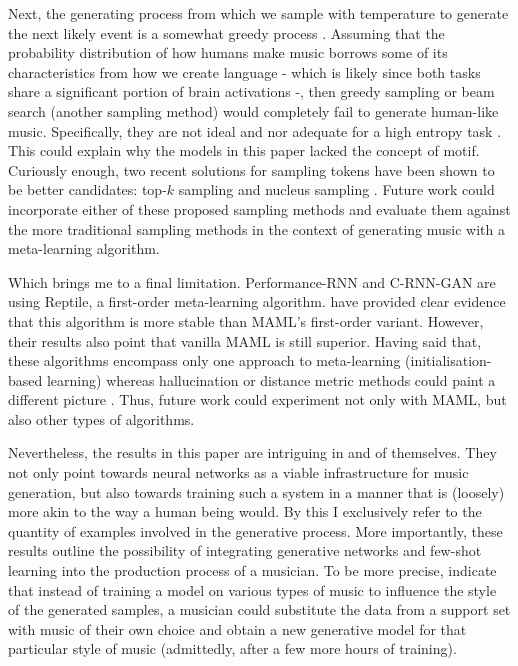 \documentclass[a4paper]{book}
\begin{document}
Next, the generating process from which we sample with temperature to generate the next likely event is a somewhat greedy process \parencite{holtzman_curious_2019}. Assuming that the probability distribution of how humans make music borrows some of its characteristics from how we create language - which is likely since both tasks share a significant portion of brain activations \parencite{brown_music_2006} -, then greedy sampling or beam search (another sampling method) would completely fail to generate human-like music. Specifically, they are not ideal and nor adequate for a high entropy task \parencite{holtzman_curious_2019}. This could explain why the models in this paper lacked the concept of motif. Curiously enough, two recent solutions for sampling tokens have been shown to be better candidates: top-$k$ sampling \parencite{fan_hierarchical_2018} and nucleus sampling \parencite[also known as top-$p$ sampling;][]{holtzman_curious_2019}. Future work could incorporate either of these proposed sampling methods and evaluate them against the more traditional sampling methods in the context of generating music with a meta-learning algorithm.

Which brings me to a final limitation. Performance-RNN and C-RNN-GAN are using Reptile, a first-order meta-learning algorithm. \textcite{nichol_first-order_2018} have provided clear evidence that this algorithm is more stable than MAML's first-order variant. However, their results also point that vanilla MAML is still superior. Having said that, these algorithms encompass only one approach to meta-learning (initialisation-based learning) whereas hallucination or distance metric methods could paint a different picture \parencite{chen_closer_2018}. Thus, future work could experiment not only with MAML, but also other types of algorithms.

Nevertheless, the results in this paper are intriguing in and of themselves. They not only point towards neural networks as a viable infrastructure for music generation, but also towards training such a system in a manner that is (loosely) more akin to the way a human being would. By this I exclusively refer to the quantity of examples involved in the generative process. More importantly, these results outline the possibility of integrating generative networks and few-shot learning into the production process of a musician. To be more precise, \textcite{larochelle_few-shot_2017} indicate that instead of training a model on various types of music to influence the style of the generated samples, a musician could substitute the data from a support set with music of their own choice and obtain a new generative model for that particular style of music (admittedly, after a few more hours of training).
\end{document}
